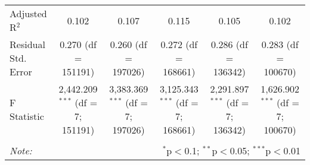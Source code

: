 \begin{table}[!htbp]
\begin{tabular}{@{\extracolsep{3pt}}lccccc}
Adjusted R$^{2}$ & 0.102 & 0.107 & 0.115 & 0.105 & 0.102 \\ 
Residual Std. Error & 0.270 (df = 151191) & 0.260 (df = 197026) & 0.272 (df = 168661) & 0.286 (df = 136342) & 0.283 (df = 100670) \\ 
F Statistic & 2,442.209$^{***}$ (df = 7; 151191) & 3,383.369$^{***}$ (df = 7; 197026) & 3,125.343$^{***}$ (df = 7; 168661) & 2,291.897$^{***}$ (df = 7; 136342) & 1,626.902$^{***}$ (df = 7; 100670) \\ 
\hline 
\hline \\[-1.8ex] 
\textit{Note:}  & \multicolumn{5}{r}{$^{*}$p$<$0.1; $^{**}$p$<$0.05; $^{***}$p$<$0.01} \\ 
\end{tabular} 
\end{table} 
